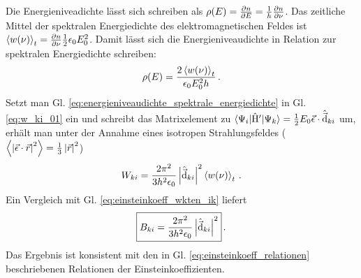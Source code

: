 Die Energieniveadichte lässt sich schreiben als
$\rho(E)=\frac{\partial n}{\partial E}=\frac{1}{h}\frac{\partial n}{\partial \nu}$.
Das zeitliche Mittel der spektralen Energiedichte des elektromagnetischen Feldes
ist $\left\langle w(\nu)\right\rangle_t=\frac{\partial n}{\partial \nu}\frac{1}{2}\epsilon_0 E^2_0$. Damit lässt
sich die Energieniveaudichte in Relation zur spektralen Energiedichte schreiben:
\begin{equation}\label{eq:energieniveaudichte_spektrale_energiedichte}
	\rho(E)=\frac{2\left\langle w(\nu)\right\rangle_t}{\epsilon_0 E_0^2h}\,.
\end{equation}
Setzt man Gl. \eqref{eq:energieniveaudichte_spektrale_energiedichte} in
Gl. \eqref{eq:w_ki_01} ein und schreibt das Matrixelement
zu $\langle{\Psi_i}|\hat{\mathrm{H}}'|{\Psi_k}\rangle =
\frac{1}{2}E_0\vec{\epsilon}\cdot\hat{\vec{\mathrm{d}}}_{ki}$ um, erhält
man unter der Annahme eines isotropen Strahlungsfeldes
($\left\langle \left|\vec{\epsilon}\cdot\vec{r}\right|^2\right\rangle = \frac{1}{3}\left|\vec{r}\right|^2$)
\begin{equation}\label{eq:w_ki_02}
	W_{ki}
	= \frac{2\pi^2}{3h^2\epsilon_0}\left|\hat{\vec{\mathrm{d}}}_{ki}\right|^2\left\langle w(\nu)\right\rangle_t\,.
\end{equation}
Ein Vergleich mit Gl. \eqref{eq:einsteinkoeff_wkten_ik} liefert
\begin{equation}\label{eq:einstein_koeff_B}
	\boxed{
		B_{ki} = \frac{2\pi^2}{3h^2\epsilon_0}\left|\hat{\vec{\mathrm{d}}}_{ki}\right|^2
	}\,.
\end{equation}
Das Ergebnis ist konsistent mit den in Gl.
\eqref{eq:einsteinkoeff_relationen} beschriebenen Relationen der
Einsteinkoeffizienten.

